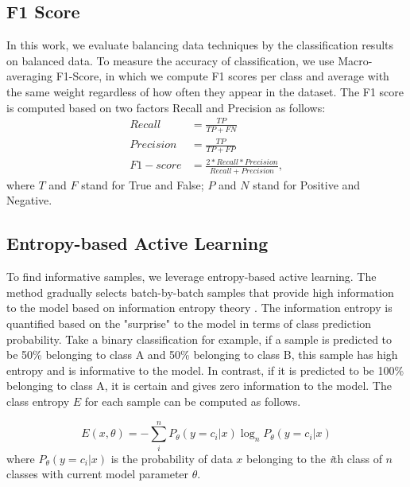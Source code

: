\documentclass[final,5p,times, twocolumn]{elsarticle}
\begin{document}
	\subsection{F1 Score}
	\label{f1score}
	In this work, we evaluate balancing data techniques by the classification results on balanced data. To measure the accuracy of classification, we use Macro-averaging F1-Score, in which we compute F1 scores per class and average with the same weight regardless of how often they appear in the dataset. The F1 score is computed based on two factors Recall and Precision as follows:\\
	
	\begin{align}
		Recall &= \frac{TP}{TP+FN}\\
		Precision &= \frac{TP}{TP+FP}\\
		F1-score &= \frac{2*Recall*Precision}{Recall+Precision},
	\end{align}
	where $T$ and $F$ stand for True and False; $P$ and $N$ stand for Positive and Negative. 
	
	\subsection{Entropy-based Active Learning }   
	\label{sec:EAL}
	To find informative samples, we leverage entropy-based active learning. The method gradually selects batch-by-batch samples that provide high information to the model based on information entropy theory \cite{shannon_mathematical_1948}. The information entropy is quantified based on the "surprise" to the model in terms of class prediction probability. Take a binary classification for example, if a sample is predicted to be 50\% belonging to class A and 50\% belonging to class B, this sample has high entropy and is informative to the model. In contrast, if it is predicted to be 100\% belonging to class A, it is certain and gives zero information to the model. The class entropy $E$ for each sample can be computed as follows. 
	
	\begin{equation}
		E(x,\theta) = -\sum_i^n{ P_\theta( y=c_i|x) \log_n P_\theta(y=c_i|x) }
		\label{eq:entropy_AL}
	\end{equation} 
	where $P_\theta(y=c_i|x)$ is the probability of data $x$ belonging to the \textit{i}th class of $n$ classes with current model parameter $\theta$.
	
\end{document}
